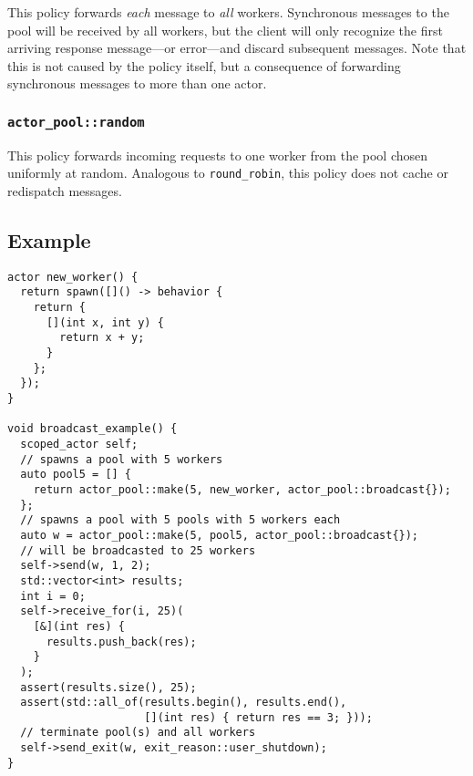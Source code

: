 This policy forwards \emph{each} message to \emph{all} workers.
Synchronous messages to the pool will be received by all workers, but the client will only recognize the first arriving response message---or error---and discard subsequent messages.
Note that this is not caused by the policy itself, but a consequence of forwarding synchronous messages to more than one actor.

\subsubsection{\lstinline^actor_pool::random^}

This policy forwards incoming requests to one worker from the pool chosen uniformly at random.
Analogous to \lstinline^round_robin^, this policy does not cache or redispatch messages.

\subsection{Example}

\begin{lstlisting}
actor new_worker() {
  return spawn([]() -> behavior {
    return {
      [](int x, int y) {
        return x + y;
      }
    };
  });
}

void broadcast_example() {
  scoped_actor self;
  // spawns a pool with 5 workers
  auto pool5 = [] {
    return actor_pool::make(5, new_worker, actor_pool::broadcast{});
  };
  // spawns a pool with 5 pools with 5 workers each
  auto w = actor_pool::make(5, pool5, actor_pool::broadcast{});
  // will be broadcasted to 25 workers
  self->send(w, 1, 2);
  std::vector<int> results;
  int i = 0;
  self->receive_for(i, 25)(
    [&](int res) {
      results.push_back(res);
    }
  );
  assert(results.size(), 25);
  assert(std::all_of(results.begin(), results.end(),
                     [](int res) { return res == 3; }));
  // terminate pool(s) and all workers
  self->send_exit(w, exit_reason::user_shutdown);
}
\end{lstlisting}
